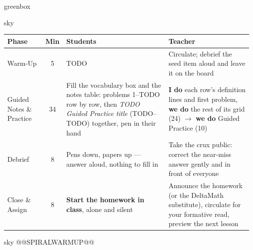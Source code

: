 \documentclass[10pt]{article}
\begin{document}
\begin{skillbox}{greenbox}
\end{skillbox}

\boxguard[30]
\begin{skillbox}{sky}
\renewcommand{\arraystretch}{1.25}
\begin{tabularx}{\linewidth}{@{}l c X X@{}}
\textbf{Phase} & \textbf{Min} & \textbf{Students} & \textbf{Teacher} \\
\hline
Warm-Up & 5 & TODO & Circulate; debrief the seed item aloud and leave it on the board \\
Guided Notes \& Practice & 34 & Fill the vocabulary box and the notes table: problems 1--TODO row by row, then \emph{TODO Guided Practice title} (TODO--TODO) together, pen in their hand & \textbf{I do} each row's definition lines and first problem, \textbf{we do} the rest of its grid (24) $\to$ \textbf{we do} Guided Practice (10) \\
Debrief & 8 & Pens down, papers up --- answer aloud, nothing to fill in & Take the crux public: correct the near-miss answer gently and in front of everyone \\
Close \& Assign & 8 & \textbf{Start the homework in class}, alone and silent & Announce the homework (or the DeltaMath substitute), circulate for your formative read, preview the next lesson \\
\end{tabularx}
\end{skillbox}

\boxguard[20]
\begin{skillbox}{sky}
@@SPIRALWARMUP@@
\end{skillbox}
\end{document}
